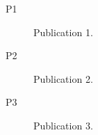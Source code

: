 \begin{publications}

\begin{description}
\item[\label{pubs:p1}{P1}] Publication 1.
\item[\label{pubs:p2}{P2}] Publication 2.
\item[\label{pubs:p3}{P3}] Publication 3.
\end{description}



\end{publications}